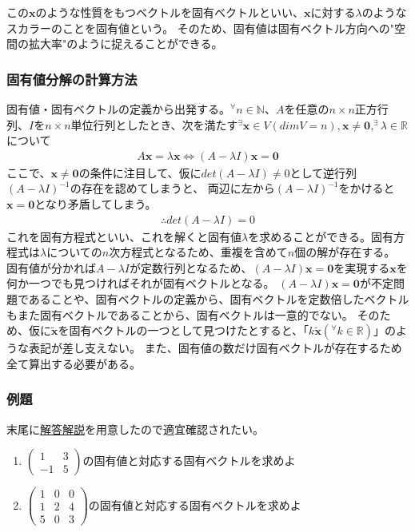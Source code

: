 \documentclass[10pt]{ujarticle}
\begin{document}
この$\mathbf{x}$のような性質をもつベクトルを固有ベクトルといい、$\mathbf{x}$に対する$\lambda$のようなスカラーのことを固有値という。
そのため、固有値は固有ベクトル方向への"空間の拡大率"のように捉えることができる。

\subsubsection{固有値分解の計算方法}
固有値・固有ベクトルの定義から出発する。$^\forall n\in\mathbb{N}$、$A$を任意の$n\times n$正方行列、$I$を$n\times n$単位行列としたとき、次を満たす$^\exists\mathbf{x}\in V(dimV=n),\mathbf{x}\neq\mathbf{0},^\exists\lambda\in\mathbb{R}$について
$$
\begin{aligned}
  A\mathbf{x}=\lambda\mathbf{x}\Leftrightarrow(A-\lambda I)\mathbf{x}=\mathbf{0}
\end{aligned}
$$
ここで、$\mathbf{x}\neq\mathbf{0}$の条件に注目して、仮に$det(A-\lambda I)\neq0$として逆行列$(A-\lambda I)^{-1}$の存在を認めてしまうと、
両辺に左から$(A-\lambda I)^{-1}$をかけると$\mathbf{x}=\mathbf{0}$となり矛盾してしまう。
$$
\begin{aligned}
  \therefore det(A-\lambda I)=0
\end{aligned}
$$
これを固有方程式といい、これを解くと固有値$\lambda$を求めることができる。固有方程式は$\lambda$についての$n$次方程式となるため、重複を含めて$n$個の解が存在する。
固有値が分かれば$A-\lambda I$が定数行列となるため、$(A-\lambda I)\mathbf{x}=\mathbf{0}$を実現する$\mathbf{x}$を何か一つでも見つければそれが固有ベクトルとなる。
$(A-\lambda I)\mathbf{x}=\mathbf{0}$が不定問題であることや、固有ベクトルの定義から、固有ベクトルを定数倍したベクトルもまた固有ベクトルであることから、固有ベクトルは一意的でない。
そのため、仮に$\tilde{\mathbf{x}}$を固有ベクトルの一つとして見つけたとすると、「$k\tilde{\mathbf{x}}(^\forall k\in\mathbb{R})$」のような表記が差し支えない。
また、固有値の数だけ固有ベクトルが存在するため全て算出する必要がある。
\subsubsection{例題}
末尾に\hyperlink{q2}{解答解説}を用意したので適宜確認されたい。
\begin{enumerate}
  \item $\begin{pmatrix}1&3\\-1&5\end{pmatrix}$の固有値と対応する固有ベクトルを求めよ
  \item $\begin{pmatrix}1&0&0\\1&2&4\\5&0&3\end{pmatrix}$の固有値と対応する固有ベクトルを求めよ
\end{enumerate}
\end{document}
